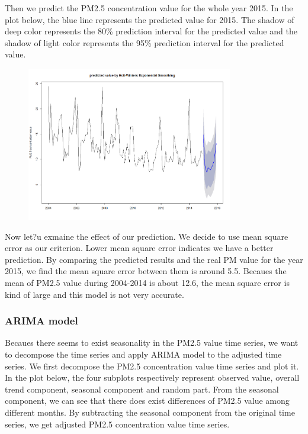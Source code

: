 \documentclass[10pt]{article}
\begin{document}
Then we predict the PM2.5 concentration value for the whole year 2015. In the plot below, the blue line represents the predicted value for 2015. The shadow of deep color represents the 80\% prediction interval for the predicted value and the shadow of light color represents the 95\% prediction interval for the predicted value.

\begin{figure}[ht!]
\centering
\includegraphics[width = 90mm]{ts3.png}
\end{figure}

Now let?u exmaine the effect of our prediction. We decide to use mean square error as our criterion. Lower mean square error indicates we have a better prediction. By comparing the predicted results and the real PM value for the year 2015, we find the mean square error between them is around 5.5. Becaues the mean of PM2.5 value during 2004-2014 is about 12.6, the mean square error is kind of large and this model is not very accurate.

\subsubsection{ARIMA model}
Becaues there seems to exist seasonality in the PM2.5 value time series, we want to decompose the time series and apply ARIMA model to the adjusted time series. We first decompose the PM2.5 concentration value time series and plot it. In the plot below, the four subplots respectively represent observed value, overall trend component, seasonal component and random part. From the seasonal component, we can see that there does exist differences of PM2.5 value among different months. By subtracting the seasonal component from the original time series, we get adjusted PM2.5 concentration value time series.
\end{document}
